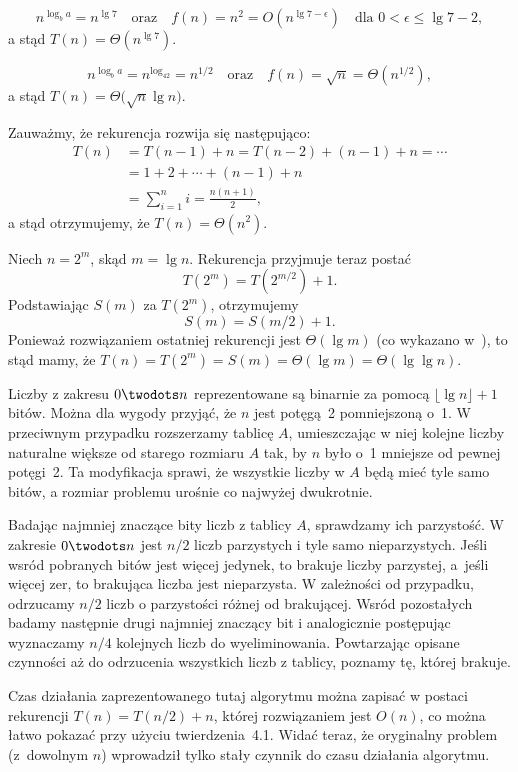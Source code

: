 \subproblem %
\[
	n^{\log_ba} = n^{\lg7} \quad\text{oraz}\quad f(n) = n^2 = O(n^{\lg7-\epsilon}) \quad\text{dla $0<\epsilon\le\lg7-2$},
\]
a stąd $T(n)=\Theta(n^{\lg7})$.

\subproblem %
\[
	n^{\log_ba} = n^{\log_42} = n^{1/2} \quad\text{oraz}\quad f(n) = \sqrt{n} = \Theta(n^{1/2}),
\]
a stąd $T(n)=\Theta\bigl(\!\sqrt{n}\lg n\bigr)$.

\subproblem %
Zauważmy, że rekurencja rozwija się następująco:
\begin{align*}
	T(n) &= T(n-1)+n = T(n-2)+(n-1)+n = \cdots \\
	&= 1+2+\cdots+(n-1)+n \\
	&= \sum_{i=1}^ni = \frac{n(n+1)}{2},
\end{align*}
a stąd otrzymujemy, że $T(n)=\Theta(n^2)$.

\subproblem %
Niech $n=2^m$, skąd $m=\lg n$. Rekurencja przyjmuje teraz postać
\[
	T(2^m) = T(2^{m/2})+1.
\]
Podstawiając $S(m)$ za $T(2^m)$, otrzymujemy
\[
	S(m) = S(m/2)+1.
\]
Ponieważ rozwiązaniem ostatniej rekurencji jest $\Theta(\lg m)$ (co wykazano w~), to stąd mamy, że $T(n)=T(2^m)=S(m)=\Theta(\lg m)=\Theta(\lg\lg n)$.

Liczby z zakresu $0\twodots n$ reprezentowane są binarnie za pomocą $\lfloor\lg n\rfloor+1$ bitów. Można dla wygody przyjąć, że $n$ jest potęgą~2 pomniejszoną o~1. W przeciwnym przypadku rozszerzamy tablicę $A$, umieszczając w niej kolejne liczby naturalne większe od starego rozmiaru $A$ tak, by $n$ było o~1 mniejsze od pewnej potęgi~2. Ta modyfikacja sprawi, że wszystkie liczby w $A$ będą mieć tyle samo bitów, a rozmiar problemu urośnie co najwyżej dwukrotnie.

Badając najmniej znaczące bity liczb z tablicy $A$, sprawdzamy ich parzystość. W zakresie $0\twodots n$ jest $n/2$ liczb parzystych i tyle samo nieparzystych. Jeśli wsród pobranych bitów jest więcej jedynek, to brakuje liczby parzystej, a~jeśli więcej zer, to brakująca liczba jest nieparzysta. W zależności od przypadku, odrzucamy $n/2$ liczb o parzystości różnej od brakującej. Wsród pozostałych badamy następnie drugi najmniej znaczący bit i analogicznie postępując wyznaczamy $n/4$ kolejnych liczb do wyeliminowania. Powtarzając opisane czynności aż do odrzucenia wszystkich liczb z tablicy, poznamy tę, której brakuje.

Czas działania zaprezentowanego tutaj algorytmu można zapisać w postaci rekurencji $T(n)=T(n/2)+n$, której rozwiązaniem jest $O(n)$, co można łatwo pokazać przy użyciu twierdzenia~4.1. Widać teraz, że oryginalny problem (z~dowolnym $n$) wprowadził tylko stały czynnik do czasu działania algorytmu.

